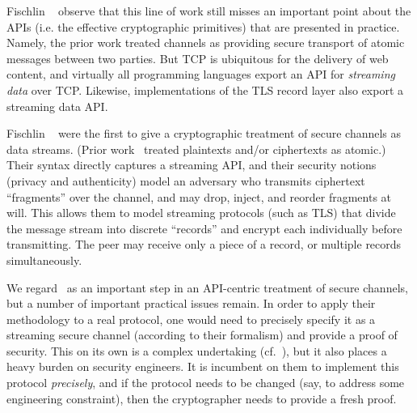 Fischlin \etal~\cite{FPMG15} observe that this line of work still
misses an important point about the APIs (i.e. the effective cryptographic
primitives) that are presented in practice.  Namely, the prior work treated
channels as providing secure transport of atomic messages between two parties.
%
%
But TCP is ubiquitous for the delivery of web content, and virtually
all programming languages export an API for \emph{streaming data} over
TCP.  Likewise, implementations of
the TLS record layer also export a streaming data API. 
%
Fischlin \etal~\cite{FPMG15} were the first to give a cryptographic
treatment of secure channels as data streams. (Prior
work~\cite{BDPS12,BFK+13} treated plaintexts and/or
ciphertexts as atomic.)
%
Their syntax directly captures a streaming API, and their security notions
(privacy and authenticity) model an adversary who transmits ciphertext
``fragments'' over the channel, and may drop, inject, and reorder fragments at
will.  This allows them to model streaming protocols (such as TLS) that divide
the message stream into discrete ``records'' and encrypt each individually
before transmitting. The peer may receive only a piece of a record, or multiple
records simultaneously.

We regard~\cite{FPMG15} as an important step in an API-centric
treatment of secure channels, but a number of important practical
issues remain.
%
In order to apply their methodology to a real protocol, one would need to
precisely specify it as a streaming secure channel (according to their
formalism) and provide a proof of security. This on its own is a complex
undertaking (cf.~\cite{DLFK+17}), but it also places a heavy burden on security
engineers. It is incumbent on them to implement this protocol \emph{precisely},
and if the protocol needs to be changed (say, to address some engineering
constraint), then the cryptographer needs to provide a fresh proof.

